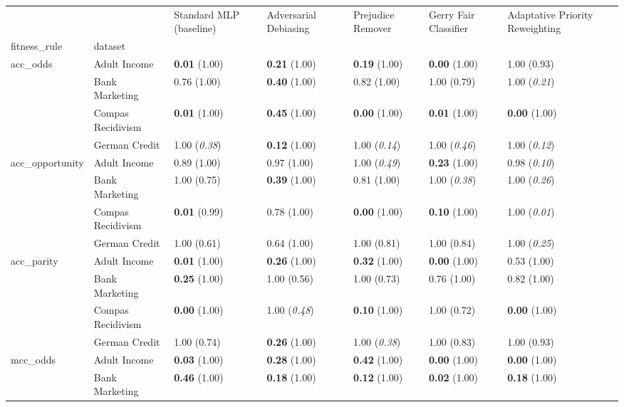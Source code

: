 \begin{tabular}{lllllll}
\toprule
 &  & Standard MLP (baseline) & Adversarial Debiasing & Prejudice Remover & Gerry Fair Classifier & Adaptative Priority Reweighting \\
fitness_rule & dataset &  &  &  &  &  \\
\midrule
\multirow[t]{4}{*}{acc_odds} & Adult Income & \textbf{0.01} (1.00) & \textbf{0.21} (1.00) & \textbf{0.19} (1.00) & \textbf{0.00} (1.00) & 1.00 (0.93) \\
 & Bank Marketing & 0.76 (1.00) & \textbf{0.40} (1.00) & 0.82 (1.00) & 1.00 (0.79) & 1.00 (\textit{0.21}) \\
 & Compas Recidivism & \textbf{0.01} (1.00) & \textbf{0.45} (1.00) & \textbf{0.00} (1.00) & \textbf{0.01} (1.00) & \textbf{0.00} (1.00) \\
 & German Credit & 1.00 (\textit{0.38}) & \textbf{0.12} (1.00) & 1.00 (\textit{0.14}) & 1.00 (\textit{0.46}) & 1.00 (\textit{0.12}) \\
\cline{1-7}
\multirow[t]{4}{*}{acc_opportunity} & Adult Income & 0.89 (1.00) & 0.97 (1.00) & 1.00 (\textit{0.49}) & \textbf{0.23} (1.00) & 0.98 (\textit{0.10}) \\
 & Bank Marketing & 1.00 (0.75) & \textbf{0.39} (1.00) & 0.81 (1.00) & 1.00 (\textit{0.38}) & 1.00 (\textit{0.26}) \\
 & Compas Recidivism & \textbf{0.01} (0.99) & 0.78 (1.00) & \textbf{0.00} (1.00) & \textbf{0.10} (1.00) & 1.00 (\textit{0.01}) \\
 & German Credit & 1.00 (0.61) & 0.64 (1.00) & 1.00 (0.81) & 1.00 (0.84) & 1.00 (\textit{0.25}) \\
\cline{1-7}
\multirow[t]{4}{*}{acc_parity} & Adult Income & \textbf{0.01} (1.00) & \textbf{0.26} (1.00) & \textbf{0.32} (1.00) & \textbf{0.00} (1.00) & 0.53 (1.00) \\
 & Bank Marketing & \textbf{0.25} (1.00) & 1.00 (0.56) & 1.00 (0.73) & 0.76 (1.00) & 0.82 (1.00) \\
 & Compas Recidivism & \textbf{0.00} (1.00) & 1.00 (\textit{0.48}) & \textbf{0.10} (1.00) & 1.00 (0.72) & \textbf{0.00} (1.00) \\
 & German Credit & 1.00 (0.74) & \textbf{0.26} (1.00) & 1.00 (\textit{0.38}) & 1.00 (0.83) & 1.00 (0.93) \\
\cline{1-7}
\multirow[t]{4}{*}{mcc_odds} & Adult Income & \textbf{0.03} (1.00) & \textbf{0.28} (1.00) & \textbf{0.42} (1.00) & \textbf{0.00} (1.00) & \textbf{0.00} (1.00) \\
 & Bank Marketing & \textbf{0.46} (1.00) & \textbf{0.18} (1.00) & \textbf{0.12} (1.00) & \textbf{0.02} (1.00) & \textbf{0.18} (1.00) \\

\end{tabular}
